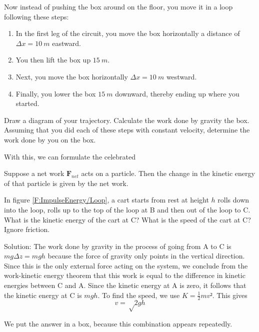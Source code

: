 \begin{exercise}
\label{Ex:Conservative}
Now instead of pushing the box around on the floor, you move it in a loop following these steps: 
\begin{enumerate}
\item In the first leg of the circuit, you move the box horizontally a distance of $Δx = 10\ m$ eastward. 
\item You then lift the box up $15\ m$.
\item Next, you move the box horizontally $Δx = 10\ m$ westward. 
\item Finally, you lower the box $15\ m$ downward, thereby ending up where you started. 
\end{enumerate}
Draw a diagram of your trajectory. Calculate the work done by gravity the box. Assuming that you did each of these steps with constant velocity, determine the work done by you on the box. \end{exercise}



With this, we can formulate the celebrated
\begin{theorem}
\label{Th:WKE}
Suppose a net work $𝐅_{net}$ acts on a particle. Then the change in the kinetic energy of that particle is given by the net work. 
\end{theorem}


\begin{example}
\label{X:Loop}
In figure \ref{F:ImpulseEnergy/Loop}, a cart starts from rest at height $h$ rolls down into the loop, rolls up to the top of the loop at B and then out of the loop to C. What is the kinetic energy of the cart at C? What is the speed of the cart at C? Ignore friction.

Solution: The work done by gravity in the process of going from A to C is $mgΔz = mgh$ because the force of gravity only points in the vertical direction. Since this is the only external force acting on the system, we conclude from the work-kinetic energy theorem that this work is equal to the difference in kinetic energies between C and A. Since the kinetic energy at A is zero, it follows that the kinetic energy at C is $mgh$. To find the speed, we use $K=\tfrac12 mv²$. This gives 
$$
\boxed{v = √{2gh}}
$$
\end{example}
We put the answer in a box, because this combination appears repeatedly.

